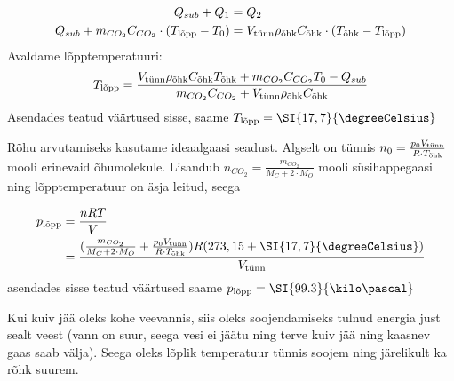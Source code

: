 \begin{align*}
    Q_{sub} + Q_1 &= Q_2 \\
    Q_{sub} + m_{CO_2}C_{CO_{2}}\cdot(T_{\textup{lõpp}}-T_{0}) &= V_{\textup{tünn}}\rho_{\textup{õhk}}C_{\textup{õhk}}\cdot(T_{\textup{õhk}}-T_{\textup{lõpp}})\\
\end{align*}
Avaldame lõpptemperatuuri:
\begin{equation*}
    T_{\textup{lõpp}} = \frac{V_{\textup{tünn}}\rho_{\textup{õhk}}C_{\textup{õhk}}T_{\textup{õhk}}+m_{CO_2}C_{CO_{2}}T_{0}-Q_{sub}}{m_{CO_2}C_{CO_{2}}+V_{\textup{tünn}}\rho_{\textup{õhk}}C_{\textup{õhk}}}
\end{equation*}
Asendades teatud väärtused sisse, saame \(T_{\textup{lõpp}} = \SI{17,7}{\degreeCelsius}\) 

Rõhu arvutamiseks kasutame ideaalgaasi seadust. Algselt on tünnis \(n_0 =\frac{p_0V_{\textup{tünn}}}{R\cdot T_{\textup{õhk}}}\) mooli erinevaid õhumolekule. Lisandub \(n_{CO_2} = \frac{m_{CO_2}}{M_{C} + 2\cdot M_{O}}\) mooli süsihappegaasi ning lõpptemperatuur on äsja leitud, seega

\begin{align*}
    p_{\textup{lõpp}} &= \frac{nRT}{V}\\
    &=\frac{(\frac{m_{CO_2}}{M_{C} + 2\cdot M_{O}}+\frac{p_0V_{\textup{tünn}}}{R\cdot T_{\textup{õhk}}})R(273,15 + \SI{17,7}{\degreeCelsius})}{V_{\textup{tünn}}}
\end{align*}
asendades sisse teatud väärtused saame \(p_{\textup{lõpp}} = \SI{99.3}{\kilo\pascal}\)

Kui kuiv jää oleks kohe veevannis, siis oleks soojendamiseks tulnud energia just sealt veest (vann on suur, seega vesi ei jäätu ning terve kuiv jää ning kaasnev gaas saab välja). Seega oleks lõplik temperatuur tünnis soojem ning järelikult ka rõhk suurem.
\probend